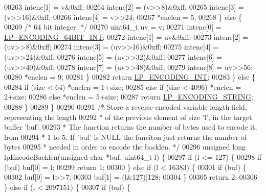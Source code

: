 \begin{DoxyCode}
00263             intenc[1] = v&0xff;
00264             intenc[2] = (v>>8)&0xff;
00265             intenc[3] = (v>>16)&0xff;
00266             intenc[4] = v>>24;
00267             *enclen = 5;
00268         \} \textcolor{keywordflow}{else} \{
00269             \textcolor{comment}{/* 64 bit integer. */}
00270             uint64\_t uv = v;
00271             intenc[0] = \hyperlink{listpack_8c_af93eef022c1590a9a592384e54df54c4}{LP\_ENCODING\_64BIT\_INT};
00272             intenc[1] = uv&0xff;
00273             intenc[2] = (uv>>8)&0xff;
00274             intenc[3] = (uv>>16)&0xff;
00275             intenc[4] = (uv>>24)&0xff;
00276             intenc[5] = (uv>>32)&0xff;
00277             intenc[6] = (uv>>40)&0xff;
00278             intenc[7] = (uv>>48)&0xff;
00279             intenc[8] = uv>>56;
00280             *enclen = 9;
00281         \}
00282         \textcolor{keywordflow}{return} \hyperlink{listpack_8c_a6f31184b7647732d04b0518b59261b62}{LP\_ENCODING\_INT};
00283     \} \textcolor{keywordflow}{else} \{
00284         \textcolor{keywordflow}{if} (size < 64) *enclen = 1+size;
00285         \textcolor{keywordflow}{else} \textcolor{keywordflow}{if} (size < 4096) *enclen = 2+size;
00286         \textcolor{keywordflow}{else} *enclen = 5+size;
00287         \textcolor{keywordflow}{return} \hyperlink{listpack_8c_acc1f8e726cc13c4d44351668652cea05}{LP\_ENCODING\_STRING};
00288     \}
00289 \}
00290 
00291 \textcolor{comment}{/* Store a reverse-encoded variable length field, representing the length}
00292 \textcolor{comment}{ * of the previous element of size 'l', in the target buffer 'buf'.}
00293 \textcolor{comment}{ * The function returns the number of bytes used to encode it, from}
00294 \textcolor{comment}{ * 1 to 5. If 'buf' is NULL the funciton just returns the number of bytes}
00295 \textcolor{comment}{ * needed in order to encode the backlen. */}
00296 \textcolor{keywordtype}{unsigned} \textcolor{keywordtype}{long} lpEncodeBacklen(\textcolor{keywordtype}{unsigned} \textcolor{keywordtype}{char} *buf, uint64\_t l) \{
00297     \textcolor{keywordflow}{if} (l <= 127) \{
00298         \textcolor{keywordflow}{if} (buf) buf[0] = l;
00299         \textcolor{keywordflow}{return} 1;
00300     \} \textcolor{keywordflow}{else} \textcolor{keywordflow}{if} (l < 16383) \{
00301         \textcolor{keywordflow}{if} (buf) \{
00302             buf[0] = l>>7;
00303             buf[1] = (l&127)|128;
00304         \}
00305         \textcolor{keywordflow}{return} 2;
00306     \} \textcolor{keywordflow}{else} \textcolor{keywordflow}{if} (l < 2097151) \{
00307         \textcolor{keywordflow}{if} (buf) \{

\end{DoxyCode}
